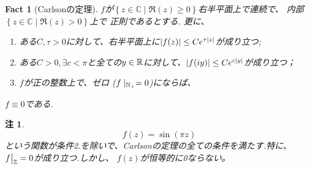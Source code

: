 \documentclass[12pt]{article} %
\newtheorem*{fact*}{Fact}
\newtheorem*{remark*}{\textbf{注}}
\theoremstyle{remark}
\begin{document}
{\begin{fact*}[Carlsonの定理]
	$f$が$\left\{ z\in\mathbb{C}\mid \Re(z)\ge0 \right\}$右半平面上で連続で、
	内部$\left\{ z\in\mathbb{C}\mid\Re(z)>0 \right\}$上で
	正則であるとする.
	更に、
	\begin{enumerate}
		\item ある$C,\tau>0$に対して、右半平面上に$\left|f(z)\right|\le C e^{\tau\left|z\right|}$が成り立つ;
		\item ある$ C>0,\exists c<\pi$と全ての$y\in\mathbb{R}$に対して、$\left|f(iy)\right|\le Ce^{c\left|y\right|}$が成り立つ；
		\item $f$が正の整数上で、ゼロ ($f\mid_{\mathbb{N}_+}=0$)にならば、
	\end{enumerate}
	$f\equiv0$である.
\end{fact*}
		
\begin{remark*}
	\begin{equation*}
		f(z)=\sin(\pi z)
	\end{equation*}
	という関数が条件2.を除いで、Carlsonの定理の全ての条件を満たす.特に、
	$f\big|_{\mathbb{Z}}=0$が成り立つ.しかし、 $f(z)$が恒等的に0ならない。


\end{remark*}}
\end{document}
